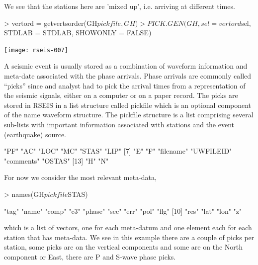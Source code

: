 \documentclass{article}
\begin{document}
We see that the stations here are 'mixed up', i.e. arriving at different times.
\begin{Schunk}
\begin{Sinput}
> vertord = getvertsorder(GH$pickfile, GH)
> PICK.GEN(GH, sel = vertord$sel, STDLAB = STDLAB, SHOWONLY = FALSE)
\end{Sinput}
\end{Schunk}
\texttt{[image: rseis-007]}

A seismic event is usually stored as a combination
of waveform information and meta-date associated with
the phase arrivals.  Phase arrivals are
commonly called ``picks'' since and analyst 
had to pick the arrival times from a representation
of the seismic signals, either on a computer or on a paper
record.
The picks are stored in RSEIS 
in a list structure called pickfile
which is an optional  component of the name waveform structure.
The pickfile structure is a list comprising several
sub-lists with important information associated with
stations and the event (earthquake) source.
\begin{Schunk}
\begin{Soutput}
 [1] "PF"       "AC"       "LOC"      "MC"       "STAS"     "LIP"     
 [7] "E"        "F"        "filename" "UWFILEID" "comments" "OSTAS"   
[13] "H"        "N"       
\end{Soutput}
\end{Schunk}
For now we consider the most relevant 
meta-data, 
\begin{Schunk}
\begin{Sinput}
> names(GH$pickfile$STAS)
\end{Sinput}
\begin{Soutput}
 [1] "tag"   "name"  "comp"  "c3"    "phase" "sec"   "err"   "pol"   "flg"  
[10] "res"   "lat"   "lon"   "z"    
\end{Soutput}
\end{Schunk}
which is a list of vectors, 
one for each meta-datum and one element
each for each station that has meta-data.
We see in this example there are a couple of picks per station,
some picks are on the vertical components and some
are on the North component or East, there
are P and S-wave phase picks.
\end{document}
